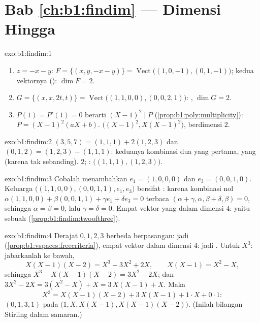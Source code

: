 \section*{Bab \ref{ch:b1:findim} --- Dimensi Hingga}

\begin{solution}{exo:b1:findim:1}
\begin{enumerate}
  \item $z = -x - y$: $F = \{(x, y, -x-y)\} =
        \operatorname{Vect}\bigl((1,0,-1), (0,1,-1)\bigr)$; kedua
        vektornya  (): $\dim F = 2$.
  \item $G = \{(x, x, 2t, t)\} =
        \operatorname{Vect}\bigl((1,1,0,0), (0,0,2,1)\bigr)$: ,
        $\dim G = 2$.
  \item $P(1) = P'(1) = 0$ berarti $(X-1)^2 \mid P$
        (\cref{prop:b1:poly:multiplicity}): $P = (X-1)^2(aX + b)$.
         $\bigl((X-1)^2, X(X-1)^2\bigr)$, berdimensi $2$.
\end{enumerate}
\end{solution}

\begin{solution}{exo:b1:findim:2}
$(3,5,7) = (1,1,1) + 2(1,2,3)$ dan $(0,1,2) = (1,2,3) - (1,1,1)$:
keduanya kombinasi dua yang pertama, yang  (karena tak
sebanding).  $2$;  :
$\bigl((1,1,1), (1,2,3)\bigr)$.
\end{solution}

\begin{solution}{exo:b1:findim:3}
Cobalah menambahkan $e_1 = (1,0,0,0)$ dan $e_3 = (0,0,1,0)$. Keluarga
$\bigl((1,1,0,0), (0,0,1,1), e_1, e_3\bigr)$ bersifat : karena kombinasi
nol $\alpha(1,1,0,0) + \beta(0,0,1,1) + \gamma e_1 + \delta
e_3 = 0$ terbaca $(\alpha + \gamma, \alpha, \beta + \delta, \beta) =
0$, sehingga $\alpha = \beta = 0$, lalu $\gamma = \delta = 0$. Empat vektor
yang  dalam dimensi $4$: yaitu sebuah 
(\cref{prop:b1:findim:twoofthree}).
\end{solution}

\begin{solution}{exo:b1:findim:4}
Derajat $0, 1, 2, 3$ berbeda berpasangan: jadi 
(\cref{prop:b1:vspaces:freecriteria}), empat vektor dalam dimensi
$4$: jadi . Untuk $X^3$: jabarkanlah ke bawah,
\[
X(X-1)(X-2) = X^3 - 3X^2 + 2X,
\qquad
X(X-1) = X^2 - X,
\]
sehingga $X^3 - X(X-1)(X-2) = 3X^2 - 2X$; dan $3X^2 - 2X = 3(X^2 - X) + X
= 3\,X(X-1) + X$. Maka
\[
X^3 = X(X-1)(X-2) + 3\,X(X-1) + 1\cdot X + 0\cdot 1 :
\]
 $(0, 1, 3, 1)$ pada $\bigl(1, X, X(X-1),
X(X-1)(X-2)\bigr)$. (Inilah bilangan Stirling dalam samaran.)
\end{solution}

